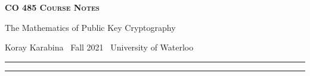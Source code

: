 \documentclass[10pt]{article}
\newcommand{\newtitle}[4]{
  \begin{center}
	\huge{\textbf{\textsc{#1 Course Notes}}}
    
	\large{\sc #2}
    
	{\sc #3 \textbullet\, #4 \textbullet\, University of Waterloo}
	\normalsize\vspace{1cm}\hrule
  \end{center}
}
\theoremstyle{newstyle}
\begin{document}
\pagestyle{fancy}
\newtitle{CO 485}{The Mathematics of Public Key Cryptography}{Koray Karabina}{Fall 2021}

\tableofcontents
\vspace{1cm}\hrule
\fancyhead[R]{\nouppercase\rightmark}
\newpage 
{}

\newpage 
\newpage 
\newpage
\newpage 
\newpage 
\newpage 

\printbibliography
\fancyhead[R]{\nouppercase\leftmark}
\end{document}
